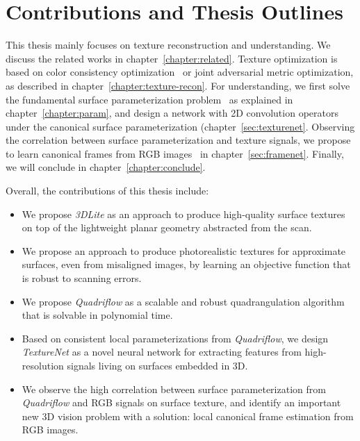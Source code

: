 \section{Contributions and Thesis Outlines}
This thesis mainly focuses on texture reconstruction and understanding. We discuss the related works in chapter~\ref{chapter:related}. Texture optimization is based on color consistency optimization~\cite{huang20173dlite} or joint adversarial metric optimization, as described in chapter~\ref{chapter:texture-recon}. For understanding, we first solve the fundamental surface parameterization problem~\cite{huang2018quadriflow} as explained in chapter~\ref{chapter:param}, and design a network with 2D convolution operators~\cite{huang2018texturenet} under the canonical surface parameterization (chapter~\ref{sec:texturenet}. Observing the correlation between surface parameterization and texture signals, we propose to learn canonical frames from RGB images~\cite{framenet} in chapter~\ref{sec:framenet}. Finally, we will conclude in chapter~\ref{chapter:conclude}.

Overall, the contributions of this thesis include:
\begin{itemize}
    \item We propose \emph{3DLite} as an approach to produce high-quality surface textures on top of the lightweight planar geometry abstracted from the scan.
    \item We propose an approach to produce photorealistic textures for approximate surfaces, even from misaligned images, by learning an objective function that is robust to scanning errors.
    \item We propose \emph{Quadriflow} as a scalable and robust quadrangulation algorithm that is solvable in polynomial time.
    \item Based on consistent local parameterizations from \emph{Quadriflow}, we design \emph{TextureNet} as a novel neural network for extracting features from high-resolution signals living on surfaces embedded in 3D.
    \item We observe the high correlation between surface parameterization from \emph{Quadriflow} and RGB signals on surface texture, and identify an important new 3D vision problem with a solution: local canonical frame estimation from RGB images.
\end{itemize}

